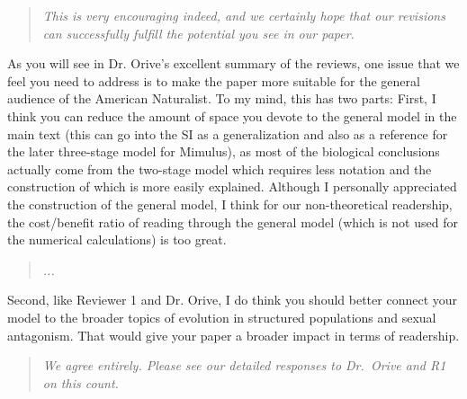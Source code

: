 \documentclass[11pt]{article}
\begin{document}
\begin{quote}
	{\itshape This is very encouraging indeed, and we certainly hope that our revisions can successfully fulfill the potential you see in our paper.}
\end{quote}

As you will see in Dr. Orive’s excellent summary of the reviews, one issue that we feel you need to address is to make the paper more suitable for the general audience of the American Naturalist. To my mind, this has two parts: First, I think you can reduce the amount of space you devote to the general model in the main text (this can go into the SI as a generalization and also as a reference for the later three-stage model for Mimulus), as most of the biological conclusions actually come from the two-stage model which requires less notation and the construction of which is more easily explained. Although I personally appreciated the construction of the general model, I think for our non-theoretical readership, the cost/benefit ratio of reading through the general model (which is not used for the numerical calculations) is too great. 

\begin{quote}
	{\itshape ...}
\end{quote}

Second, like Reviewer 1 and Dr. Orive, I do think you should better connect your model to the broader topics of evolution in structured populations and sexual antagonism. That would give your paper a broader impact in terms of readership.

\begin{quote}
	{\itshape We agree entirely. Please see our detailed responses to Dr.~Orive and R1 on this count.}
\end{quote}
\end{document}
